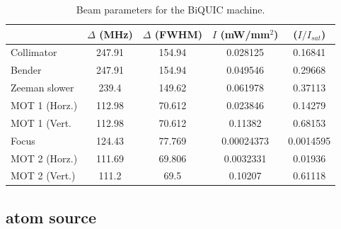 \begin{table}
\begin{tabular}{l c c c c}
\hline
   		& $\Delta$ (MHz) & $\Delta$ (FWHM)  &  $I$ (mW/mm$^2$)  &  ($I/I_{sat}$)\\
 \hline\hline
    Collimator & 247.91 & 154.94 & 0.028125 & 0.16841\\
    Bender & 247.91 & 154.94 & 0.049546 & 0.29668\\
    Zeeman slower & 239.4 & 149.62 & 0.061978 & 0.37113\\
    MOT 1 (Horz.) & 112.98 & 70.612 & 0.023846 & 0.14279\\
    MOT 1 (Vert. & 112.98 & 70.612 & 0.11382 & 0.68153\\
    Focus & 124.43 & 77.769 & 0.00024373 & 0.0014595\\
    MOT 2 (Horz.) & 111.69 & 69.806 & 0.0032331 & 0.01936\\
    MOT 2 (Vert.) & 111.2 & 69.5 & 0.10207 & 0.61118\\
\hline
\end{tabular}
\caption{Beam parameters for the BiQUIC machine. }
\label{tab:biquic_beams}
\end{table}









	
	


\subsection*{\mhe atom source}

